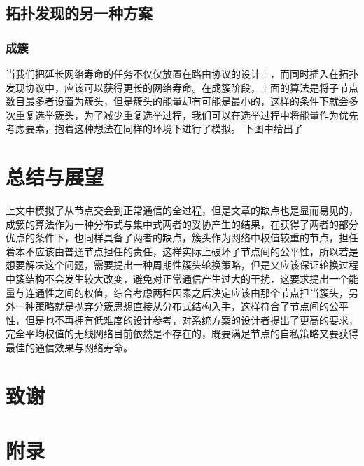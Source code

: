 \documentclass[a4paper,AutoFakeBold,oneside,12pt]{book}
\begin{document}
  \section{拓扑发现的另一种方案}
  \subsection{成簇}
  当我们把延长网络寿命的任务不仅仅放置在路由协议的设计上，而同时插入在拓扑发现协议中，应该可以获得更长的网络寿命。在成簇阶段，上面的算法是将子节点数目最多者设置为簇头，但是簇头的能量却有可能是最小的，这样的条件下就会多次重复选举簇头，为了减少重复选举过程，我们可以在选举过程中将能量作为优先考虑要素，抱着这种想法在同样的环境下进行了模拟。
  下图中给出了
  \chapter{总结与展望}
  上文中模拟了从节点交会到正常通信的全过程，但是文章的缺点也是显而易见的，成簇的算法作为一种分布式与集中式两者的妥协产生的结果，在获得了两者的部分优点的条件下，也同样具备了两者的缺点，簇头作为网络中权值较重的节点，担任着本不应该由普通节点担任的责任，这样实际上破坏了节点间的公平性，所以若是想要解决这个问题，需要提出一种周期性簇头轮换策略，但是又应该保证轮换过程中簇结构不会发生较大改变，避免对正常通信产生过大的干扰，这要求提出一个能量与连通性之间的权值，综合考虑两种因素之后决定应该由那个节点担当簇头，另外一种策略就是抛弃分簇思想直接从分布式结构入手，这样符合了节点间的公平性，但是也不再拥有低难度的设计参考，对系统方案的设计者提出了更高的要求，完全平均权值的无线网络目前依然是不存在的，既要满足节点的自私策略又要获得最佳的通信效果与网络寿命。
\clearpage{}


\clearpage{}
\chapter*{致\qquad{}谢}
\normalsize\thankwords

\chapter*{附\qquad{}录}

{}
\end{document}
